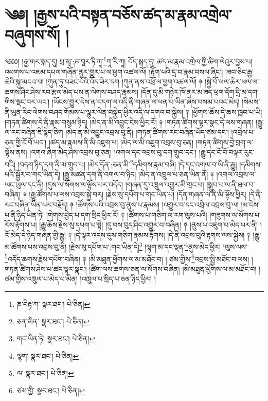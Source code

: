 \setcounter{footnote}{0} 
\chapter{༄༅། །རྒྱས་པའི་བསྟན་བཅོས་ཚད་མ་རྣམ་འགྲེལ་བཞུགས་སོ། །}༄༅༅། །རྒྱ་གར་སྐད་དུ། པྲ་མཱ་:ཎ་བཱར་ཏི་ཀཱ་\footnote{ཎ་བིརྟ་ཀ་  སྣར་ཐང་།  པེ་ཅིན། }ཀཱ་རི་ཀཱ། བོད་སྐད་དུ། ཚད་མ་རྣམ་འགྲེལ་གྱི་ཚིག་ལེའུར་བྱས་པ། འཕགས་པ་འཇམ་དཔལ་གཞོན་ནུར་གྱུར་པ་ལ་ཕྱག་འཚལ་ལོ། །རྟོག་པའི་དྲ་བ་རྣམ་བསལ་ཞིང་། །ཟབ་ཅིང་རྒྱ་ཆེའི་སྐུ་མངའ་བ། །ཀུན་ཏུ་བཟང་པོའི་འོད་ཟེར་དག །ཀུན་ནས་འཕྲོ་ལ་ཕྱག་འཚལ་ལོ། ༈ །སྐྱེ་བོ་ཕལ་ཆེར་ཕལ་ལ་ཆགས་ཤིང་ཤེས་རབ་རྩལ་མེད་པས་ན་ལེགས་བཤད་རྣམས། །དོན་དུ་མི་གཉེར་ཁོ་ནར་མ་ཟད་ཕྲག་དོག་དྲི་མ་དག་གིས་སྡང་བར་ཡང་། །ཡོངས་གྱུར་དེས་ན་བདག་ལ་འདི་ནི་གཞན་ལ་ཕན་པ་ཡིན་ཞེས་བསམ་པའང་མེད། །སེམས་ནི་ཡུན་རིང་ལེགས་བཤད་གོམས་པ་ལྷུར་ལེན་བསྐྱེད་ཕྱིར་འདི་ལ་དགའ་བ་སྐྱེས། ༈ །ཕྱོགས་ཆོས་དེ་ཆས་ཁྱབ་པ་ཡི། །གཏན་ཚིགས་དེ་ནི་རྣམ་གསུམ་ཉིད། །མེད་ན་མི་འབྱུང་ངེས་ཕྱིར་རོ། ༈ །གཏན་ཚིགས་ལྟར་སྣང་དེ་ལས་གཞན། །རྒྱུ་ལ་རང་བཞིན་ཇི་སྙེད་ཅིག །མེད་ན་མི་འབྱུང་འབྲས་བུ་ནི། །གཏན་ཚིགས་རང་བཞིན་ཡོད་ཙམ་དང་། །འབྲེལ་པ་ཅན་གྱི་ངོ་བོ་ཡང་། །ཚད་མ་རྣམས་ནི་མི་འཇུག་པ། །མེད་ལ་མི་འཇུག་འབྲས་བུ་ཅན། །གཏན་ཚིགས་བྱེ་བྲག་ལ་ལྟོས་ནས། །འགའ་ཞིག་མེད་ཤེས་འབྲས་བུ་ཅན། །འགལ་དང་འབྲས་བུ་དག་གྲུབ་དང་། །རྒྱུ་དང་ངོ་བོ་བལྟར་རུང་བའི། །བདག་ཉིད་དག་ནི་མ་གྲུབ་པ། །མེད་དོན་:ཅན་མི་\footnote{ཅན་མིན་  སྣར་ཐང་།  པེ་ཅིན། }དམིགས་རྣམ་བཞི། །དེ་དང་འགལ་བ་ཡི་ནི་རྒྱུ། །དམིགས་པའི་སྦྱོར་བ་གང་ཡིན་དེ། །རྒྱུ་མཚན་དག་ནི་འགལ་བ་ཉིད། །མེད་ན་འཁྲུལ་པ་ཅན་ཡིན་ནོ། ༈ །འགལ་འབྲས་ལ་ཡང་ཡུལ་དང་ནི། །དུས་ལ་སོགས་ལ་ལྟོས་པར་འདོད། །གཞན་དུ་འཁྲུལ་འགྱུར་མི་གྲང་བ། །སྒྲུབ་པ་ལ་ནི་ཐལ་བ་བཞིན། ༈ །རྒྱུ་ཚོགས་པ་ལས་འབྲས་སྐྱེ་བར། །རྗེས་སུ་དཔོག་པ་གང་ཡིན་པ། །དོན་གཞན་ལ་ནི་མི་ལྟོས་ཕྱིར། །དེ་ནི་རང་བཞིན་ཡིན་པར་བརྗོད། ༈ །ཚོགས་པའི་འབྲས་བུ་ནུས་པ་རྣམས། །འགྱུར་བ་དང་འབྲེལ་འབྲས་བུ་ལ། །མ་ངེས་པ་ནི་ཉིད་ཡིན་ཏེ། །གེགས་བྱེད་པ་དག་སྲིད་ཕྱིར་རོ། ༈ །ཚོགས་པ་གཅིག་ལ་རག་ལུས་པའི། །གཟུགས་ལ་སོགས་པ་རོས་རྟོགས་པ། །རྒྱུ་ཆོས་རྗེས་སུ་དཔག་པ་སྟེ། །དུ་བས་བུད་ཤིང་འགྱུར་བ་བཞིན། ༈ །ནུས་པ་འཇུག་པ་མེད་པར་ནི། །རོ་མེད་དེ་ཉིད་གཞན་གྱི་རྒྱུ། ༈ །དེ་ལྟར་འདས་དུས་གཅིག་རྣམས་རྟོགས། །དེ་ནི་འབྲས་བུའི་རྟགས་ལས་སྐྱེས། ༈ །རྒྱུ་མ་ཚོགས་པས་འབྲས་བུ་ནི། །རྗེས་སུ་དཔོག་པ་:གང་ཡིན་དེ།\footnote{གང་ཡིན་ཏེ།  སྣར་ཐང་།  པེ་ཅིན། } །ལྷག་མ་དང་ལྡན་\footnote{ལྷག་  སྣར་ཐང་།  པེ་ཅིན། }ནུས་མེད་ཕྱིར། །ལུས་ལས་\footnote{ལ་  སྣར་ཐང་།  པེ་ཅིན། }འདོད་ཆགས་རྗེས་དཔོག་བཞིན། ༈ །མི་མཐུན་ཕྱོགས་ལ་མ་མཐོང་བ། །:ཙམ་གྱིས་\footnote{ཙམ་གྱི་  སྣར་ཐང་།  པེ་ཅིན། }འབྲས་སྤྱི་མཐོང་བ་ལས། །གཏན་ཚིགས་ཤེས་པ་ཚད་ལྟར་སྣང་། །ཚིག་ལས་ཆགས་ཅན་ལ་སོགས་བཞིན། །མི་མཐུན་ཕྱོགས་ལ་མ་མཐོང་བ། །ཙམ་གྱིས་འཁྲུལ་པ་མེད་པ་མིན། །འཁྲུལ་པ་སྲིད་པ་ཅན་ཉིད་ཕྱིར། །
